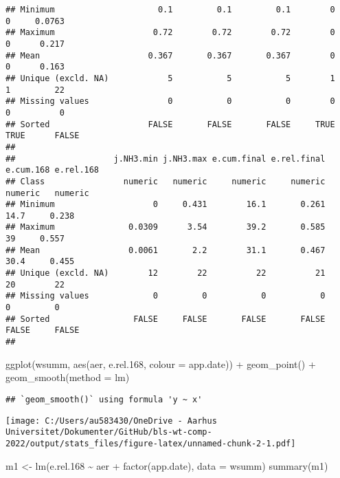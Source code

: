 \documentclass[
]{article}
\newenvironment{Shaded}{\begin{snugshade}}{\end{snugshade}}
\newcommand{\AttributeTok}[1]{\textcolor[rgb]{0.77,0.63,0.00}{#1}}
\newcommand{\FloatTok}[1]{\textcolor[rgb]{0.00,0.00,0.81}{#1}}
\newcommand{\FunctionTok}[1]{\textcolor[rgb]{0.00,0.00,0.00}{#1}}
\newcommand{\NormalTok}[1]{#1}
\newcommand{\OtherTok}[1]{\textcolor[rgb]{0.56,0.35,0.01}{#1}}
\newcommand{\SpecialCharTok}[1]{\textcolor[rgb]{0.00,0.00,0.00}{#1}}
\begin{document}
\begin{verbatim}
## Minimum                     0.1         0.1         0.1        0           0     0.0763
## Maximum                    0.72        0.72        0.72        0           0      0.217
## Mean                      0.367       0.367       0.367        0           0      0.163
## Unique (excld. NA)            5           5           5        1           1         22
## Missing values                0           0           0        0           0          0
## Sorted                    FALSE       FALSE       FALSE     TRUE        TRUE      FALSE
##                                                                                        
##                    j.NH3.min j.NH3.max e.cum.final e.rel.final e.cum.168 e.rel.168
## Class                numeric   numeric     numeric     numeric   numeric   numeric
## Minimum                    0     0.431        16.1       0.261      14.7     0.238
## Maximum               0.0309      3.54        39.2       0.585        39     0.557
## Mean                  0.0061       2.2        31.1       0.467      30.4     0.455
## Unique (excld. NA)        12        22          22          21        20        22
## Missing values             0         0           0           0         0         0
## Sorted                 FALSE     FALSE       FALSE       FALSE     FALSE     FALSE
## 
\end{verbatim}

\begin{Shaded}
\begin{Highlighting}[]
\FunctionTok{ggplot}\NormalTok{(wsumm, }\FunctionTok{aes}\NormalTok{(aer, e.rel}\FloatTok{.168}\NormalTok{, }\AttributeTok{colour =}\NormalTok{ app.date)) }\SpecialCharTok{+}
  \FunctionTok{geom\_point}\NormalTok{() }\SpecialCharTok{+} \FunctionTok{geom\_smooth}\NormalTok{(}\AttributeTok{method =}\NormalTok{ lm)}
\end{Highlighting}
\end{Shaded}

\begin{verbatim}
## `geom_smooth()` using formula 'y ~ x'
\end{verbatim}

\texttt{[image: C:/Users/au583430/OneDrive - Aarhus Universitet/Dokumenter/GitHub/bls-wt-comp-2022/output/stats\_files/figure-latex/unnamed-chunk-2-1.pdf]}

\begin{Shaded}
\begin{Highlighting}[]
\NormalTok{m1 }\OtherTok{\textless{}{-}} \FunctionTok{lm}\NormalTok{(e.rel}\FloatTok{.168} \SpecialCharTok{\textasciitilde{}}\NormalTok{ aer }\SpecialCharTok{+} \FunctionTok{factor}\NormalTok{(app.date), }\AttributeTok{data =}\NormalTok{ wsumm)}
\FunctionTok{summary}\NormalTok{(m1)}
\end{Highlighting}
\end{Shaded}
\end{document}
